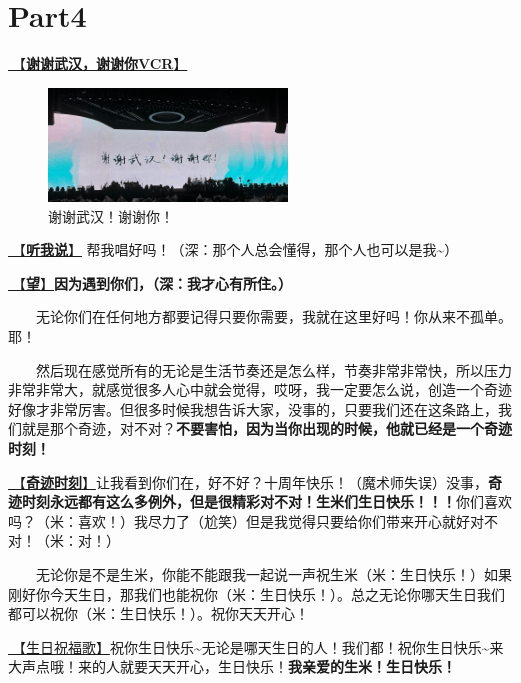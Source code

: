 \documentclass[]{ctexbook}
\begin{document}
\section{Part4}\label{wuhan-20240727-part4}

\hyperref[thank-you-vcr]{🎥【\textbf{谢谢武汉，谢谢你VCR}】}

\begin{figure}

{\centering \includegraphics[width=180pt]{img/wuhan20240727/thank-wuhan} 

}

\caption{谢谢武汉！谢谢你！}\label{fig:unnamed-chunk-56}
\end{figure}

\hyperref[listen-to-me]{🎵【\textbf{听我说}】} 帮我唱好吗！（深：那个人总会懂得，那个人也可以是我\textasciitilde）

\hyperref[hope]{🎵【\textbf{望}】}\textbf{因为遇到你们，（深：我才心有所住。）}

  无论你们在任何地方都要记得只要你需要，我就在这里好吗！你从来不孤单。耶！

  然后现在感觉所有的无论是生活节奏还是怎么样，节奏非常非常快，所以压力非常非常大，就感觉很多人心中就会觉得，哎呀，我一定要怎么说，创造一个奇迹好像才非常厉害。但很多时候我想告诉大家，没事的，只要我们还在这条路上，我们就是那个奇迹，对不对？\textbf{不要害怕，因为当你出现的时候，他就已经是一个奇迹时刻！}

\hyperref[magic-moment]{🎵【\textbf{奇迹时刻}】}让我看到你们在，好不好？十周年快乐！（魔术师失误）没事，\textbf{奇迹时刻永远都有这么多例外，但是很精彩对不对！生米们生日快乐！！！}你们喜欢吗？（米：喜欢！）我尽力了（尬笑）但是我觉得只要给你们带来开心就好对不对！（米：对！）

  无论你是不是生米，你能不能跟我一起说一声祝生米（米：生日快乐！）如果刚好你今天生日，那我们也能祝你（米：生日快乐！）。总之无论你哪天生日我们都可以祝你（米：生日快乐！）。祝你天天开心！

\hyperref[happy-birthday]{🎵【生日祝福歌】}祝你生日快乐\textasciitilde 无论是哪天生日的人！我们都！祝你生日快乐\textasciitilde 来大声点哦！来的人就要天天开心，生日快乐！\textbf{我亲爱的生米！生日快乐！}
\end{document}
